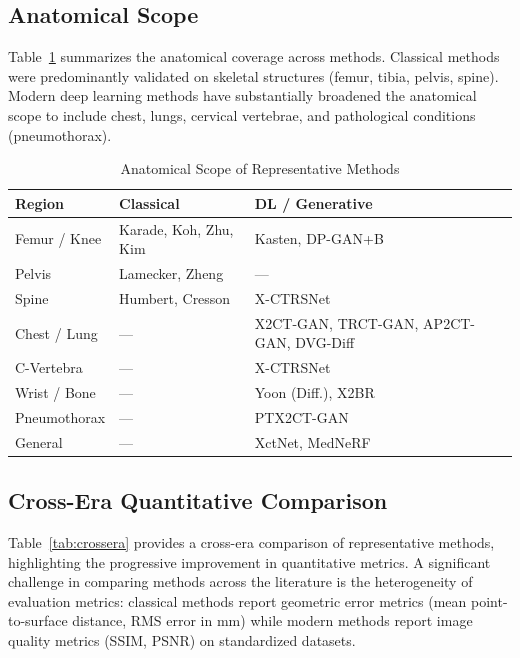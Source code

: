 \documentclass[10pt,twocolumn,a4paper]{article}
\begin{document}
\subsection{Anatomical Scope}
\label{sec:comparison:anatomy}

Table~\ref{tab:anatomical_scope} summarizes the anatomical coverage across
methods. Classical methods were predominantly validated on skeletal structures
(femur, tibia, pelvis, spine). Modern deep learning methods have substantially
broadened the anatomical scope to include chest, lungs, cervical vertebrae, and
pathological conditions (pneumothorax).

\begin{table}[h]
\caption{Anatomical Scope of Representative Methods}
\label{tab:anatomical_scope}
\centering\small
\setlength{\tabcolsep}{4pt}
\begin{tabular}{@{}p{1.7cm}p{2.2cm}p{2.3cm}@{}}
\toprule
\textbf{Region} & \textbf{Classical} & \textbf{DL / Generative}\\
\midrule
Femur / Knee & Karade, Koh, Zhu, Kim & Kasten, DP-GAN+B\\
Pelvis & Lamecker, Zheng & ---\\
Spine & Humbert, Cresson & X-CTRSNet\\
Chest / Lung & --- & X2CT-GAN, TRCT-GAN, AP2CT-GAN, DVG-Diff\\
C-Vertebra & --- & X-CTRSNet\\
Wrist / Bone & --- & Yoon (Diff.), X2BR\\
Pneumothorax & --- & PTX2CT-GAN\\
General & --- & XctNet, MedNeRF\\
\bottomrule
\end{tabular}
\end{table}

\subsection{Cross-Era Quantitative Comparison}
\label{sec:comparison:quant}

Table~\ref{tab:crossera} provides a cross-era comparison of representative
methods, highlighting the progressive improvement in quantitative metrics.
A significant challenge in comparing methods across the literature is the
heterogeneity of evaluation metrics: classical methods report geometric error
metrics (mean point-to-surface distance, RMS error in mm) while modern methods
report image quality metrics (SSIM, PSNR) on standardized datasets.
\end{document}
